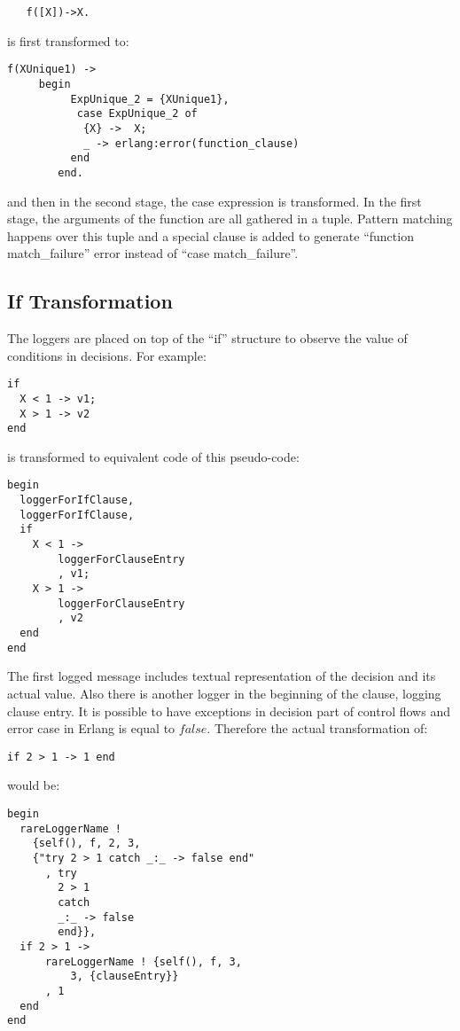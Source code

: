 \documentclass[12pt,a4paper]{report}
\begin{document}
\begin{lstlisting}
   f([X])->X.
\end{lstlisting}

is first transformed to:

\begin{lstlisting}
f(XUnique1) ->
     begin
          ExpUnique_2 = {XUnique1},
           case ExpUnique_2 of
            {X} ->  X;
            _ -> erlang:error(function_clause)
          end
        end.
\end{lstlisting}

and then in the second stage, the case expression is transformed. In the first stage, the arguments of the function are all gathered in a tuple. Pattern matching happens over
 this tuple and a special clause is added to generate ``function match\_failure'' error instead of ``case match\_failure''.

\subsection{If Transformation}
The loggers are placed on top of the “if” structure to observe the value of conditions in decisions. For example:

\begin{lstlisting}
if 
  X < 1 -> v1;
  X > 1 -> v2
end 
\end{lstlisting}

is transformed to equivalent code of this pseudo-code:

\begin{lstlisting}
begin
  loggerForIfClause,
  loggerForIfClause,  
  if 
    X < 1 ->
	    loggerForClauseEntry
	    , v1;
    X > 1 ->
	    loggerForClauseEntry
	    , v2
  end
end 
\end{lstlisting}

The first logged message includes textual representation of the decision and its actual value. Also there is another logger in the beginning of the clause, logging clause entry.
 It is possible to have exceptions in decision part of control flows and error case in Erlang is equal to $false$. Therefore the actual transformation of:

\begin{lstlisting}
if 2 > 1 -> 1 end
\end{lstlisting}

would be:

\begin{lstlisting}
begin
  rareLoggerName !
    {self(), f, 2, 3,
	{"try 2 > 1 catch _:_ -> false end"
	  , try 	
		2 > 1 
	    catch 
		_:_ -> false 
	    end}},
  if 2 > 1 ->
      rareLoggerName ! {self(), f, 3,
	      3, {clauseEntry}}
      , 1
  end
end 
\end{lstlisting}
\end{document}
